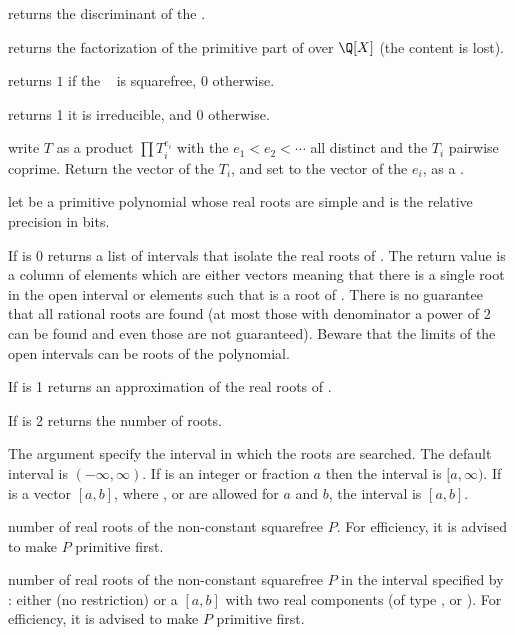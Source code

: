  returns the discriminant of the 
.

 returns the factorization of the primitive part
of  over $\Q[X]$ (the content is lost).

 returns $1$ if the
~ is squarefree, $0$ otherwise.

 returns 1 it  is irreducible, and
0 otherwise.

 write $T$ as a product $\prod T_i^{e_i}$
with the $e_1 < e_2 < \cdots$ all distinct and the $T_i$ pairwise coprime.
Return the vector of the $T_i$, and set  to the vector of the $e_i$,
as a .

 let  be a
primitive  polynomial whose real roots are simple and  is
the relative precision in bits.

\item If  is 0 returns a list of intervals that isolate the real
roots of . The return value is a column of elements which are either
vectors \kbd{[a,b]} meaning that there is a single root in the open interval
 or elements  such that  is a root of .
There is no guarantee that all rational roots are found (at most those with
denominator a power of $2$ can be found and even those are not guaranteed).
Beware that the limits of the open intervals can be roots of the polynomial.

\item If  is 1 returns an approximation of the real roots of .

\item If  is 2 returns the number of roots.

The argument  specify the interval in which the roots
are searched. The default interval is $(-\infty,\infty)$. If  is an
integer or fraction $a$ then the interval is $[a,\infty)$. If  is
a vector $[a,b]$, where ,  or  are allowed
for $a$ and $b$, the interval is $[a,b]$.

 number of real roots of the non-constant
squarefree  $P$. For efficiency, it is advised to make $P$ primitive
first.

 number of real roots of the
non-constant squarefree  $P$ in the interval specified by :
either  (no restriction) or a  $[a,b]$ with two real
components (of type ,  or ). For efficiency,
it is advised to make $P$ primitive first.

